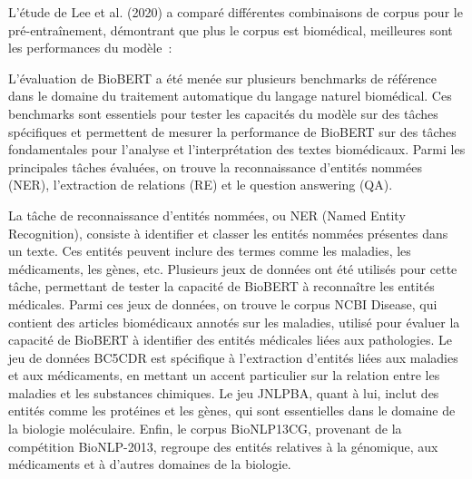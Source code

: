 \documentclass[12pt]{report}
\begin{document}
L'étude de Lee et al. (2020) a comparé différentes combinaisons de corpus pour le pré-entraînement, démontrant que plus le corpus est biomédical, meilleures sont les performances du modèle~\cite{lee2020biobert}:

\begin{table}[H]
\centering
\caption{Pré-entraînement de BioBERT selon les corpus textuels utilisés~\cite{lee2020biobert}}
\scriptsize
{}
\end{table}

L’évaluation de BioBERT a été menée sur plusieurs benchmarks de référence dans le domaine du traitement automatique du langage naturel biomédical. Ces benchmarks sont essentiels pour tester les capacités du modèle sur des tâches spécifiques et permettent de mesurer la performance de BioBERT sur des tâches fondamentales pour l’analyse et l’interprétation des textes biomédicaux. Parmi les principales tâches évaluées, on trouve la reconnaissance d’entités nommées (NER), l’extraction de relations (RE) et le question answering (QA).

La tâche de reconnaissance d’entités nommées, ou NER (Named Entity Recognition), consiste à identifier et classer les entités nommées présentes dans un texte. Ces entités peuvent inclure des termes comme les maladies, les médicaments, les gènes, etc. Plusieurs jeux de données ont été utilisés pour cette tâche, permettant de tester la capacité de BioBERT à reconnaître les entités médicales. Parmi ces jeux de données, on trouve le corpus NCBI Disease, qui contient des articles biomédicaux annotés sur les maladies, utilisé pour évaluer la capacité de BioBERT à identifier des entités médicales liées aux pathologies. Le jeu de données BC5CDR est spécifique à l’extraction d’entités liées aux maladies et aux médicaments, en mettant un accent particulier sur la relation entre les maladies et les substances chimiques. Le jeu JNLPBA, quant à lui, inclut des entités comme les protéines et les gènes, qui sont essentielles dans le domaine de la biologie moléculaire. Enfin, le corpus BioNLP13CG, provenant de la compétition BioNLP-2013, regroupe des entités relatives à la génomique, aux médicaments et à d’autres domaines de la biologie.
\end{document}
